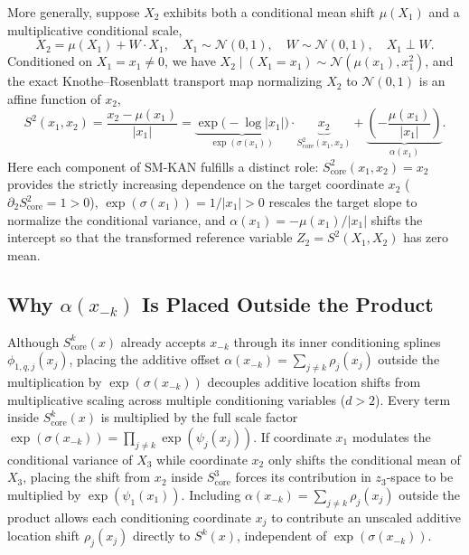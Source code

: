 \documentclass[11pt,a4paper]{article}
\theoremstyle{plain}
\theoremstyle{definition}
\theoremstyle{remark}
\begin{document}
More generally, suppose $X_2$ exhibits both a conditional mean shift $\mu(X_1)$ and a multiplicative conditional scale,
\begin{equation}
    X_2 = \mu(X_1) + W \cdot X_1, \quad X_1 \sim \mathcal{N}(0, 1), \quad W \sim \mathcal{N}(0, 1), \quad X_1 \perp W.
\end{equation}
Conditioned on $X_1 = x_1 \neq 0$, we have $X_2 \mid (X_1 = x_1) \sim \mathcal{N}(\mu(x_1), x_1^2)$, and the exact Knothe--Rosenblatt transport map normalizing $X_2$ to $\mathcal{N}(0, 1)$ is an affine function of $x_2$,
\begin{equation}
    S^2(x_1, x_2) = \frac{x_2 - \mu(x_1)}{|x_1|} = \underbrace{\exp\big(-\log|x_1|\big)}_{\exp(\sigma(x_1))} \cdot \underbrace{x_2}_{S^2_{\text{core}}(x_1, x_2)} + \underbrace{\left(-\frac{\mu(x_1)}{|x_1|}\right)}_{\alpha(x_1)}.
\end{equation}
Here each component of SM-KAN fulfills a distinct role: $S^2_{\text{core}}(x_1, x_2) = x_2$ provides the strictly increasing dependence on the target coordinate $x_2$ ($\partial_2 S^2_{\text{core}} = 1 > 0$), $\exp(\sigma(x_1)) = 1/|x_1| > 0$ rescales the target slope to normalize the conditional variance, and $\alpha(x_1) = -\mu(x_1)/|x_1|$ shifts the intercept so that the transformed reference variable $Z_2 = S^2(X_1, X_2)$ has zero mean.

\subsection{Why \texorpdfstring{$\alpha(x_{-k})$}{alpha(x\_\{-k\})} Is Placed Outside the Product}
Although $S^k_{\text{core}}(x)$ already accepts $x_{-k}$ through its inner conditioning splines $\phi_{1, q, j}(x_j)$, placing the additive offset $\alpha(x_{-k}) = \sum_{j \neq k} \rho_j(x_j)$ outside the multiplication by $\exp(\sigma(x_{-k}))$ decouples additive location shifts from multiplicative scaling across multiple conditioning variables ($d > 2$). Every term inside $S^k_{\text{core}}(x)$ is multiplied by the full scale factor $\exp(\sigma(x_{-k})) = \prod_{j \neq k} \exp(\psi_j(x_j))$. If coordinate $x_1$ modulates the conditional variance of $X_3$ while coordinate $x_2$ only shifts the conditional mean of $X_3$, placing the shift from $x_2$ inside $S^3_{\text{core}}$ forces its contribution in $z_3$-space to be multiplied by $\exp(\psi_1(x_1))$. Including $\alpha(x_{-k}) = \sum_{j \neq k} \rho_j(x_j)$ outside the product allows each conditioning coordinate $x_j$ to contribute an unscaled additive location shift $\rho_j(x_j)$ directly to $S^k(x)$, independent of $\exp(\sigma(x_{-k}))$.
\end{document}
